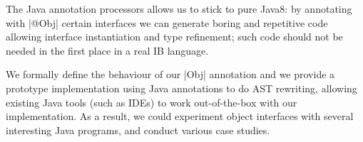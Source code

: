 

The Java annotation processors allows us to stick to pure Java8: by
annotating with \Q|@Obj| certain interfaces
we can generate boring and repetitive code
allowing interface instantiation and type refinement; such code should not be needed in the first place
in a real IB language.


%

We formally define the behaviour of our \Q|Obj| annotation and we provide a
prototype
implementation using Java annotations to do AST
rewriting, allowing existing Java tools (such as IDEs) to work
out-of-the-box with our implementation. As a result, we could
experiment object interfaces with several interesting Java programs,
and conduct various case studies.


